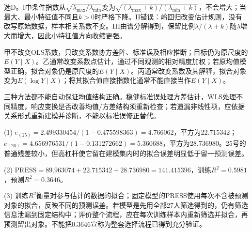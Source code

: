选D。I中条件指数从$\sqrt{\lambda_{\max}/\lambda_{\min}}$变为$\sqrt{(\lambda_{\max}+k)/(\lambda_{\min}+k)}$，不会增大；当最大、最小特征值不同且$k>0$时严格下降。II错误：岭回归改变估计规则，没有改写原始数据，样本相关系数不变。III由谱分解得到，保留比例$\lambda/(\lambda+k)$随$\lambda$增大而增大，因此小特征值方向收缩更强。
\par\nobreak\smallskip{}

甲不改变OLS系数，只改变系数协方差阵、标准误及相应推断；目标仍为原尺度的$E(Y\mid X)$。乙通常改变系数点估计，通过不同观测的相对精度加权；若原均值模型正确，拟合对象仍是原尺度的$E(Y\mid X)$。丙通常改变系数及其解释，拟合对象变为$E(\log Y\mid X)$；将其拟合值直接指数化通常不能直接当作$E(Y\mid X)$。\par 三种方法都不能自动保证均值结构正确。稳健标准误处理方差估计，WLS处理不同精度，响应变换是否改善均值/方差结构须重新检查；若遗漏非线性项，应依据关系形式重新建模并诊断，不能以标准误修正替代。
\par\nobreak\smallskip{}

(1) $e_{(25)}=2.499330454/(1-0.475598363)=4.766062$，平方为22.715342；$e_{(26)}=4.656976531/(1-0.131272662)=5.360688$，平方为28.736980。25号的普通残差较小，但高杠杆使它留在建模集内时的拟合误差明显低于留一预测误差。\par (2) $\mathrm{PRESS}=89.963074+22.715342+28.736980=141.415396$，训练$R^2=0.5981$，预测$R^2=0.3646$。\par (3) 训练$R^2$衡量对参与估计的数据的拟合；固定模型的PRESS使用每次不含被预测对象的拟合，反映不同的预测误差。若模型是先用全部27人筛选得到的，仍有筛选信息泄漏到固定结构中；评价整个流程，应在每次训练样本内重新筛选并拟合，再预测留出对象。不能把0.3646宣称为整套选择流程已得到充分验证。
\par\nobreak\smallskip{}

